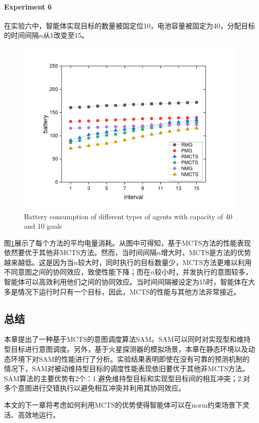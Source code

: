 \paragraph{Experiment 6}
在实验六中，智能体实现目标的数量被固定位10，电池容量被固定为40，分配目标的时间间隔$n$从1改变至15。
\begin{figure}[h!]
\centering
\includegraphics[scale=0.4]{./figs/iX_cY_fixCap40G10}
\captionsetup{justification=centering}
\caption{Battery consumption of different types of agents with capacity of 40 and 10 goals}
\label{fig:dynamic3}
\end{figure}

图\ref{fig:dynamic3}展示了每个方法的平均电量消耗。从图中可得知，基于MCTS方法的性能表现依然要优于其他非MCTS方法。然而，当时间间隔$n$增大时，MCTS是方法的优势越来越低。这是因为当$n$较大时，同时执行的目标数量少，MCTS方法更难以利用不同意图之间的协同效应，致使性能下降；而在$n$较小时，并发执行的意图较多，智能体可以高效利用他们之间的协同效应。当时间间隔被设定为15时，智能体在大多是情况下运行时只有一个目标，因此，MCTS的性能与其他方法非常接近。
\subsection{总结}
本章提出了一种基于MCTS的意图调度算法SAM。SAM可以同时对实现型和维持型目标进行意图调度。另外，基于火星探测器的模拟场景，本章在静态环境以及动态环境下对SAM的性能进行了分析。实验结果表明即使在没有可靠的预测机制的情况下，SAM对被动维持型目标的调度性能表现依旧要优于其他非MCTS方法。SAM算法的主要优势有2个：1.避免维持型目标和实现型目标间的相互冲突；2.对多个意图进行交错执行以避免相互冲突并利用其协同效应。

本文的下一章将考虑如何利用MCTS的优势使得智能体可以在norm约束场景下灵活、高效地运行。
